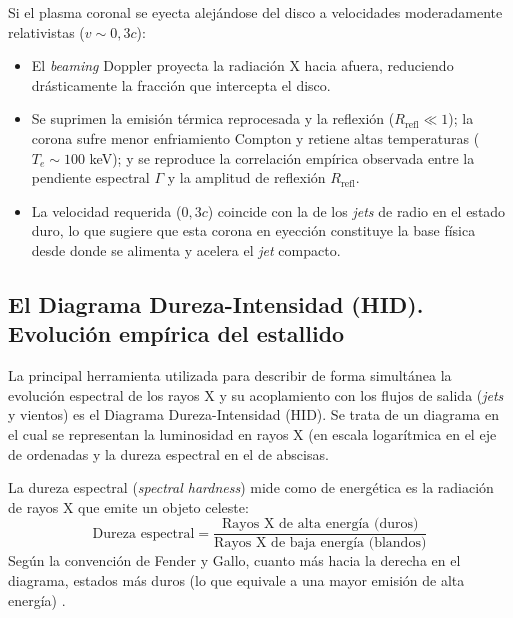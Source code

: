 \begin{itemize}
\begin{enumerate}
        Si el plasma coronal se eyecta alejándose del disco a velocidades moderadamente relativistas ($v \sim 0,3c$): 
        \begin{itemize}
            \item[$\bullet$] El \textit{beaming} Doppler proyecta la radiación X hacia afuera, reduciendo drásticamente la fracción que intercepta el disco.
            \item[$\bullet$] Se suprimen la emisión térmica reprocesada y la reflexión ($R_{\mbox{refl}} \ll 1$); la corona sufre menor enfriamiento Compton y retiene altas temperaturas ($T_e \sim 100$ keV); y se reproduce la correlación empírica observada entre la pendiente espectral $\Gamma$ y la amplitud de reflexión $R_{\mbox{refl}}$. 
            \item[$\bullet$] La velocidad requerida ($0,3c$) coincide con la de los \textit{jets} de radio en el estado duro, lo que sugiere que esta corona en eyección constituye la base física desde donde se alimenta y acelera el \textit{jet} compacto.
        \end{itemize}
    \end{enumerate}
\end{itemize}

\subsection{El Diagrama Dureza-Intensidad (HID). Evolución empírica del estallido}

\noindent La principal herramienta utilizada para describir de forma simultánea la evolución espectral de los rayos X y su acoplamiento con los flujos de salida (\textit{jets} y vientos) es el Diagrama Dureza-Intensidad (HID). Se trata de un diagrama en el cual se representan la luminosidad en rayos X (en escala logarítmica en el eje de ordenadas y la dureza espectral en el de abscisas.

La dureza espectral (\textit{spectral hardness}) mide como de energética es la radiación de rayos X que emite un objeto celeste:
\begin{equation}
    \mbox{Dureza espectral} = \frac{\mbox{Rayos X de alta energía (duros)}}{\mbox{Rayos X de baja energía (blandos)}}
\end{equation}
Según la convención de Fender y Gallo, cuanto más hacia la derecha en el diagrama, estados más duros (lo que equivale a una mayor emisión de alta energía) \cite{fender_gallo}. 

